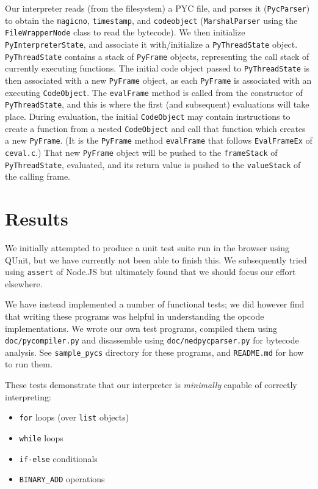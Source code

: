 \documentclass{article}
\begin{document}
Our interpreter reads (from the filesystem) a PYC file, and parses it (\texttt{PycParser}) to obtain the \texttt{magicno}, \texttt{timestamp}, and \texttt{codeobject} (\texttt{MarshalParser} using the \texttt{FileWrapperNode} class to read the bytecode). We then initialize \texttt{PyInterpreterState}, and associate it with/initialize a \texttt{PyThreadState} object. \texttt{PyThreadState}
contains a stack of \texttt{PyFrame} objects, representing the call stack of currently executing functions. The initial code object passed to \texttt{PyThreadState} is then associated with a new \texttt{PyFrame} object, as each \texttt{PyFrame} is associated with an executing \texttt{CodeObject}. The \texttt{evalFrame} method is called from the constructor of \texttt{PyThreadState}, and this is where the first (and subsequent) evaluations will take place.
During evaluation, the initial \texttt{CodeObject} may contain instructions to create a function from a nested \texttt{CodeObject} and call that function which creates a new \texttt{PyFrame}. 
(It is the \texttt{PyFrame} method \texttt{evalFrame} that follows \texttt{EvalFrameEx} of \texttt{ceval.c}.)
That new \texttt{PyFrame} object will be pushed to the \texttt{frameStack} of \texttt{PyThreadState}, evaluated, and its return value is pushed to the \texttt{valueStack} of the calling frame.

\section*{Results}

We initially attempted to produce a unit test suite run in the browser using QUnit, but we have currently not been able to finish this. We subsequently tried using \texttt{assert} of Node.JS but ultimately found that we should focus our effort elsewhere.

We have instead implemented a number of functional tests; we did however find that writing these programs was helpful in understanding the opcode implementations. We wrote our own test programs, compiled them using \texttt{doc/pycompiler.py} and disassemble using \texttt{doc/nedpycparser.py} for bytecode analysis. See \texttt{sample\_pycs} directory for these programs, and \texttt{README.md} for how to run them.

These tests demonstrate that our interpreter is \textit{minimally} capable of correctly interpreting:
\begin{itemize}
\item \texttt{for} loops (over \texttt{list} objects)
\item \texttt{while} loops
\item \texttt{if-else} conditionals
\item \texttt{BINARY\_ADD} operations
\end{itemize}
\end{document}

